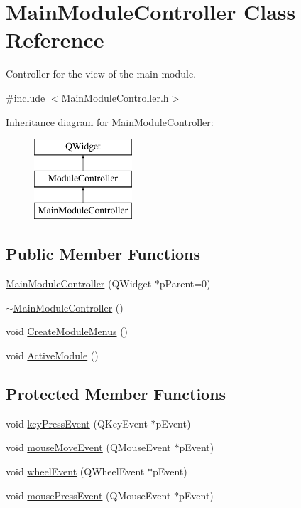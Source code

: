 \hypertarget{class_main_module_controller}{\section{Main\+Module\+Controller Class Reference}
\label{class_main_module_controller}
}


Controller for the view of the main module.  




{\ttfamily \#include $<$Main\+Module\+Controller.\+h$>$}

Inheritance diagram for Main\+Module\+Controller\+:\begin{figure}[H]
\begin{center}
\leavevmode
\includegraphics[height=3.000000cm]{class_main_module_controller}
\end{center}
\end{figure}
\subsection*{Public Member Functions}
\begin{DoxyCompactItemize}
\item 
\hyperlink{class_main_module_controller_a68245c2e1f54660d79c3abae49f1c81a}{Main\+Module\+Controller} (Q\+Widget $\ast$p\+Parent=0)
\item 
\hyperlink{class_main_module_controller_a86bd935f0877a696bcff11ae6079386a}{$\sim$\+Main\+Module\+Controller} ()
\item 
void \hyperlink{class_main_module_controller_a45fcd4ba1637051ae7d8335cc4d3c143}{Create\+Module\+Menus} ()
\item 
void \hyperlink{class_main_module_controller_a1c0454b2e4efcb22e8c92e7bcf0764c2}{Active\+Module} ()
\end{DoxyCompactItemize}
\subsection*{Protected Member Functions}
\begin{DoxyCompactItemize}
\item 
void \hyperlink{class_main_module_controller_a3f22dbf628ed5a9cadb13308a8d07914}{key\+Press\+Event} (Q\+Key\+Event $\ast$p\+Event)
\item 
void \hyperlink{class_main_module_controller_a67f9ef4226aef89c7859c4ed7c449a4a}{mouse\+Move\+Event} (Q\+Mouse\+Event $\ast$p\+Event)
\item 
void \hyperlink{class_main_module_controller_a2a348142ba887e1c06c4a7192fd55272}{wheel\+Event} (Q\+Wheel\+Event $\ast$p\+Event)
\item 
void \hyperlink{class_main_module_controller_a6b1cb0636640890ec071571d17ee02fb}{mouse\+Press\+Event} (Q\+Mouse\+Event $\ast$p\+Event)
\end{DoxyCompactItemize}
